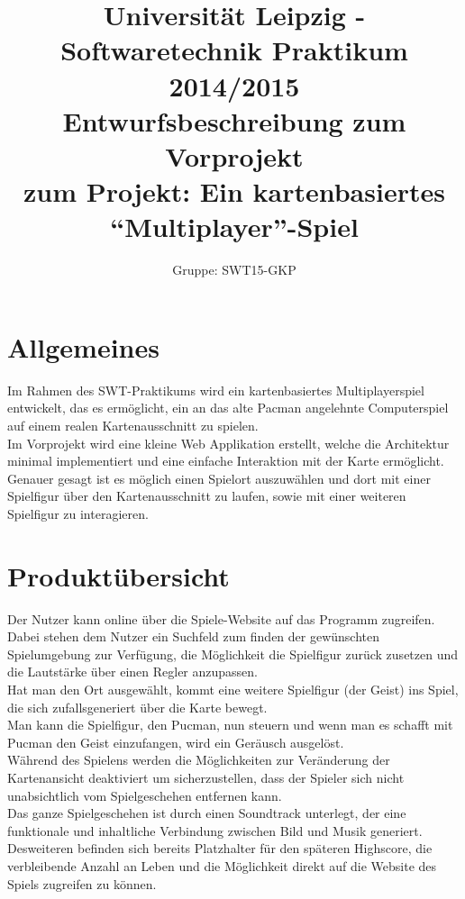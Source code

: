 \documentclass[11pt,a4paper]{article}
\author{Gruppe: SWT15-GKP}
\title{Universität Leipzig - Softwaretechnik Praktikum 2014/2015 \\  Entwurfsbeschreibung zum Vorprojekt \\ zum Projekt: Ein kartenbasiertes “Multiplayer”-Spiel}
\begin{document}
\maketitle

\clearpage

\tableofcontents

\clearpage

\flushleft
\section{Allgemeines}
Im Rahmen des SWT-Praktikums wird ein kartenbasiertes Multiplayerspiel entwickelt, das es ermöglicht, ein an das alte Pacman angelehnte Computerspiel auf einem realen Kartenausschnitt zu spielen. \\
Im Vorprojekt wird eine kleine Web Applikation erstellt, welche die Architektur minimal implementiert und eine einfache Interaktion mit der Karte ermöglicht.
Genauer gesagt ist es möglich einen Spielort auszuwählen und dort mit einer Spielfigur über den Kartenausschnitt zu laufen, sowie mit einer weiteren Spielfigur zu interagieren.


\section{Produktübersicht}
Der Nutzer kann online über die Spiele-Website auf das Programm zugreifen.
Dabei stehen dem Nutzer ein Suchfeld zum finden der gewünschten Spielumgebung zur Verfügung, die Möglichkeit die Spielfigur zurück zusetzen und die Lautstärke über einen Regler anzupassen. \\
Hat man den Ort ausgewählt, kommt eine weitere Spielfigur (der Geist) ins Spiel, die sich zufallsgeneriert über die Karte bewegt. \\
Man kann die Spielfigur, den Pucman, nun steuern und wenn man es schafft mit Pucman den Geist einzufangen, wird ein Geräusch ausgelöst. \\
Während des Spielens werden die Möglichkeiten zur Veränderung der Kartenansicht deaktiviert um sicherzustellen, dass der Spieler sich nicht unabsichtlich vom Spielgeschehen entfernen kann. \\
Das ganze Spielgeschehen ist durch einen Soundtrack unterlegt, der eine  funktionale und inhaltliche Verbindung zwischen Bild und Musik  generiert. \\
Desweiteren befinden sich bereits Platzhalter für den späteren Highscore, die verbleibende Anzahl an Leben und die Möglichkeit direkt auf die Website des Spiels zugreifen zu können.
\clearpage
\end{document}
